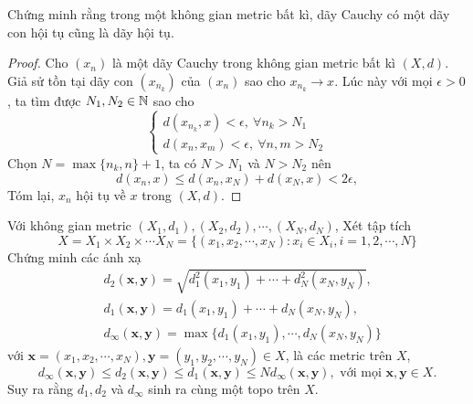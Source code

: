 \begin{exercise}{8}
    Chứng minh rằng trong một không gian metric bất kì, dãy Cauchy có một dãy con hội tụ cũng là dãy hội tụ.
\end{exercise}

\begin{proof}
    Cho $(x_n)$ là một dãy Cauchy trong không gian metric bất kì $(X,d)$. Giả sử tồn tại dãy con $(x_{n_k})$ của $(x_n)$ sao cho $x_{n_k} \rightarrow x$. Lúc này với mọi $\epsilon > 0$, ta tìm được $N_1, N_2 \in \mathbb N$ sao cho
    $$\begin{cases}
        d(x_{n_k},x) < \epsilon,\ \forall n_k > N_1\\
        d(x_n, x_m) < \epsilon,\ \forall n,m > N_2
    \end{cases}$$
    Chọn $N = \max\{n_k, n\} + 1$, ta có $N > N_1$ và $N > N_2$ nên
    $$
        d(x_n,x) \leq d(x_n, x_N) + d(x_N,x) < 2 \epsilon,
    $$
    Tóm lại, $x_n$ hội tụ về $x$ trong $(X,d)$.
\end{proof}

\begin{exercise}{9}
    Với không gian metric $(X_1,d_1), (X_2,d_2), \cdots, (X_N,d_N)$, Xét tập tích
    $$
        X = X_1 \times X_2 \times \cdots X_N = \{(x_1,x_2,\cdots,x_N): x_i \in X_i, i = 1,2,\cdots,N\}
    $$
    Chứng minh các ánh xạ
    \begin{align*}
        &d_2(\mathbf{x}, \mathbf{y}) = \sqrt{d_1^2(x_1,y_1) + \cdots + d_N^2(x_N,y_N)},\\
        &d_1(\mathbf{x}, \mathbf{y}) = d_1(x_1,y_1) + \cdots + d_N(x_N,y_N),\\
        &d_{\infty}(\mathbf{x}, \mathbf{y}) = \max\{d_1(x_1,y_1), \cdots, d_N(x_N,y_N)\}
    \end{align*}
    với $\mathbf{x} = (x_1,x_2,\cdots,x_N), \mathbf{y} = (y_1,y_2,\cdots,y_N) \in X$, là các metric trên $X$,
    $$
        d_{\infty}(\mathbf{x}, \mathbf{y}) \leq d_{2}(\mathbf{x}, \mathbf{y}) \leq d_{1}(\mathbf{x}, \mathbf{y}) \leq N d_{\infty}(\mathbf{x}, \mathbf{y}), \text{ với mọi } \mathbf{x}, \mathbf{y} \in X.
    $$
    Suy ra rằng $d_1,d_2$ và $d_{\infty}$ sinh ra cùng một topo trên $X$.
\end{exercise}

